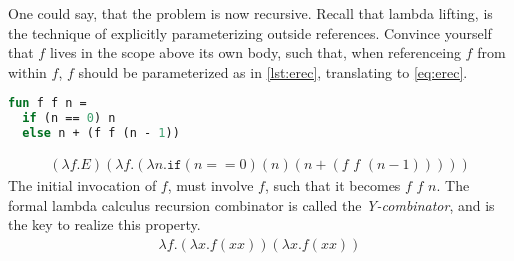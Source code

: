 \documentclass[11pt,oneside,a4paper]{report}
\begin{document}
One could say, that the problem is now recursive.
Recall that lambda lifting, is the technique of explicitly parameterizing outside references.
Convince yourself that $f$ lives in the scope above its own body, such that, when referenceing $f$ from within $f$, $f$ should be parameterized as in \autoref{lst:erec}, translating to \autoref{eq:erec}.
\begin{lstlisting}[language=ML,caption={Explicitly passing recursive function},label={lst:erec},xleftmargin=.32\textwidth]
fun f f n = 
  if (n == 0) n
  else n + (f f (n - 1))
\end{lstlisting}
\begin{align}
    (\lambda f . E) (\lambda f . (\lambda n . \texttt{if} (n == 0) (n) (n + (f \,\, f \,\, (n - 1)))))
    \label{eq:erec}
\end{align}
The initial invocation of $f$, must involve $f$, such that it becomes $f \,\, f \,\, n$.
The formal lambda calculus recursion combinator is called the \textit{Y-combinator}, and is the key to realize this property.
\begin{align}
    \lambda f . (\lambda x . f (x x)) (\lambda x . f (x x))
    \label{eq:ycomb}
\end{align}
\end{document}
